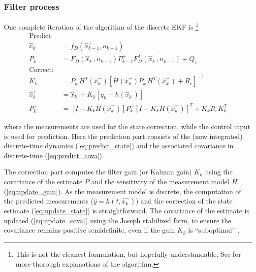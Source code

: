 \subsubsection{Filter process}
One complete iteration of the algorithm of the discrete EKF is \cite{lewis2008, werner2021b, minh2012} \footnote{This is not the cleanest formulation, but hopefully understandable. See \cite[pp. 259]{lewis2008} for more thorough explanations of the algorithm.}
\begin{align}
    \text{Predict: } \nonumber \\
     \hat x_k^- &= f_D(\hat x_{k-1}^+, u_{k-1}) \label{eq:predict_state} \\
    P_k^- &= F_D(\hat x_k^-, u_{k-1}) P_{k-1}^+ F_D^T(\hat x_k^-, u_{k-1}) + Q_e \label{eq:predict_cova}  \\
     \text{Correct: } \nonumber \\
    K_{k} &= P_{k}^{-} H^T(\hat x_{k}^{-}) \left[ H(\hat x_{k}^{-}) P_{k}^{-} H^T(\hat x_{k}^{-}) + R_e \right]^{-1} \label{eq:update_gain} \\
    \hat x_{k}^{+} &= \hat x_{k}^{-} + K_{k} \left[ y_{k} - h(\hat x_{k}^{-}) \right] \label{eq:update_state}\\
    P_{k}^{+} &= \left[ I - K_{k} H(\hat x_{k}^{-}) \right] P_{k}^{-}\left[ I - K_{k} H(\hat x_{k}^{-}) \right]^T +  K_{k} R_e K_{k}^T \label{eq:update_cova}
\end{align}

where the measurements are used for the state correction, while the control input is used for prediction.
Here the prediction part consists of the (now integrated) discrete-time dynamics (\autoref{eq:predict_state}) and the associated covariance in discrete-time (\autoref{eq:predict_cova}).

The correction part computes the filter gain (or Kalman gain) $K_k$ using the covariance of the estimate $P$ and the sensitivity of the measurement model $H$ (\autoref{eq:update_gain}).
As the measurement model is discrete, the computation of the predicted measurements ($\hat y = h(t,\hat x_k^-)$) and the correction of the state estimate (\autoref{eq:update_state}) is straightforward.
The covariance of the estimate is updated  (\autoref{eq:update_cova}) using the Joseph stabilized form, to ensure the covariance remains positive semidefinite, even if the gain $K_k$ is ``suboptimal'' \cite{lewis2008}.

